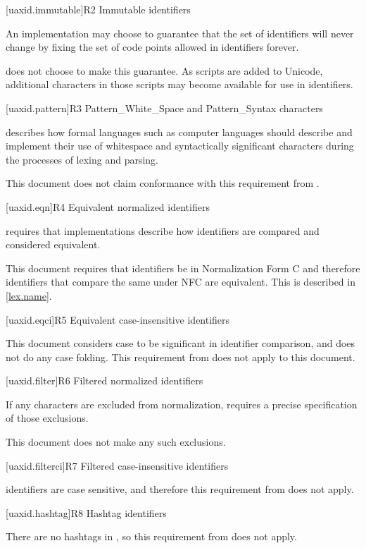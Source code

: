 [uaxid.immutable]{R2 Immutable identifiers}

\pnum
An implementation may choose to guarantee that
the set of identifiers will never change
by fixing the set of code points allowed in identifiers forever.

\pnum
\Cpp{} does not choose to make this guarantee.
As scripts are added to Unicode,
additional characters in those scripts may become available
for use in identifiers.

[uaxid.pattern]{R3 Pattern_White_Space and Pattern_Syntax characters}

\pnum
{} describes how formal languages
such as computer languages should describe and implement
their use of whitespace and syntactically significant characters
during the processes of lexing and parsing.

\pnum
This document does not claim conformance with this requirement from .

[uaxid.eqn]{R4 Equivalent normalized identifiers}

\pnum
{} requires that implementations describe
how identifiers are compared and considered equivalent.

\pnum
This document requires that identifiers be in Normalization Form C and
therefore identifiers that compare the same under NFC are equivalent.
This is described in \ref{lex.name}.

[uaxid.eqci]{R5 Equivalent case-insensitive identifiers}

\pnum
This document considers case to be significant in identifier comparison, and
does not do any case folding.
This requirement from  does not apply to this document.

[uaxid.filter]{R6 Filtered normalized identifiers}

\pnum
If any characters are excluded from normalization,
 requires a precise specification of those exclusions.

\pnum
This document does not make any such exclusions.

[uaxid.filterci]{R7 Filtered case-insensitive identifiers}

\pnum
\Cpp{} identifiers are case sensitive, and
therefore this requirement from  does not apply.

[uaxid.hashtag]{R8 Hashtag identifiers}

\pnum
There are no hashtags in \Cpp{}, so this requirement from  does not apply.
